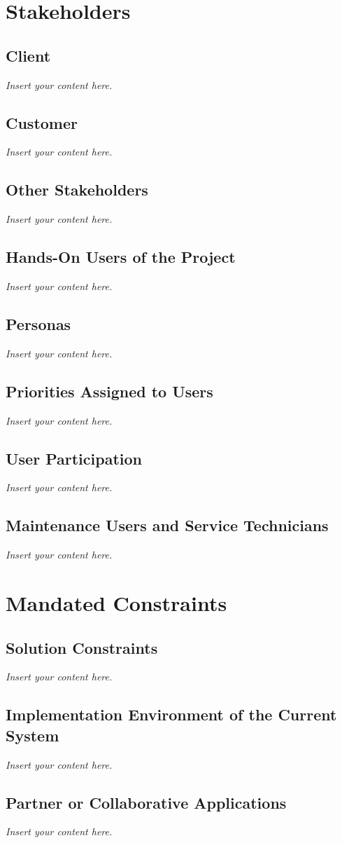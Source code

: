 \documentclass[12pt]{article}
\newcommand{\lips}{\textit{Insert your content here.}}
\begin{document}
\section{Stakeholders}
\subsection{Client}
\lips
\subsection{Customer}
\lips
\subsection{Other Stakeholders}
\lips
\subsection{Hands-On Users of the Project}
\lips
\subsection{Personas}
\lips
\subsection{Priorities Assigned to Users}
\lips
\subsection{User Participation}
\lips
\subsection{Maintenance Users and Service Technicians}
\lips

\section{Mandated Constraints}
\subsection{Solution Constraints}
\lips
\subsection{Implementation Environment of the Current System}
\lips
\subsection{Partner or Collaborative Applications}
\lips
\end{document}

